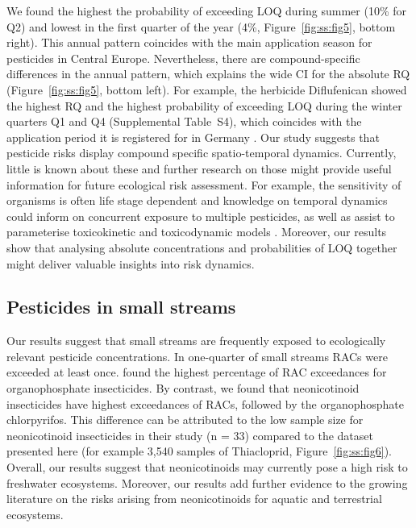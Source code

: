 We found the highest the probability of exceeding LOQ during summer (10\% for Q2) and lowest in the first quarter of the year (4\%, Figure~\ref{fig:ss:fig5}, bottom right).
This annual pattern coincides with the main application season for pesticides in Central Europe.
Nevertheless, there are compound-specific differences in the annual pattern, which explains the wide CI for the absolute RQ (Figure~\ref{fig:ss:fig5}, bottom left). 
For example, the herbicide Diflufenican showed the highest RQ and the highest probability of exceeding LOQ during the winter quarters Q1 and Q4 (Supplemental Table~S4), which coincides with the application period it is registered for in Germany \citep{bvl_online_2016}.
Our study suggests that pesticide risks display compound specific spatio-temporal dynamics.
Currently, little is known about these and further research on those might provide useful information for future ecological risk assessment. 
For example, the sensitivity of organisms is often life stage dependent \citep{hutchinson1998analysis} and knowledge on temporal dynamics could inform on concurrent exposure to multiple pesticides, as well as assist to parameterise toxicokinetic and toxicodynamic models \citep{ashauer2016modelling}. 
Moreover, our results show that analysing absolute concentrations and probabilities of LOQ together might deliver valuable insights into risk dynamics.


\subsection{Pesticides in small streams}
Our results suggest that small streams are frequently exposed to ecologically relevant pesticide concentrations.
In one-quarter of small streams RACs were exceeded at least once.
\citet{stehle_pesticide_2015} found the highest percentage of RAC exceedances for organophosphate insecticides. 
By contrast, we found that neonicotinoid insecticides have highest exceedances of RACs, followed by the organophosphate chlorpyrifos. 
This difference can be attributed to the low sample size for neonicotinoid insecticides in their study (n = 33) compared to the dataset presented here (for example 3,540 samples of Thiacloprid, Figure~\ref{fig:ss:fig6}). 
Overall, our results suggest that neonicotinoids may currently pose a high risk to freshwater ecosystems. 
Moreover, our results add further evidence to the growing literature on the risks arising from neonicotinoids for aquatic \citep{morrissey2015neonicotinoid} and terrestrial \citep{pisa2015effects} ecosystems. 

